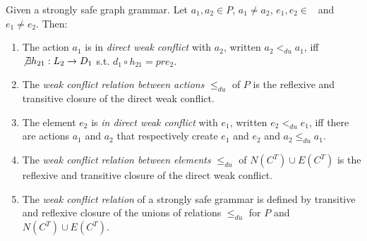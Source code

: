 \begin{definition}\label{def:unconditional-conflict} Given \doublyTypedGraphGrammarCore{} a strongly safe graph grammar. Let $a_1, a_2 \in P$, $a_1 \ne a_2$, \mbox{$e_1, e_2 \in $ \coreGraph{}} and $e_1 \ne e_2$. Then: 

  \begin{enumerate}
    \item The action $a_1$ is in \emph{direct weak conflict} with $a_2$, written $a_2 <_{du} a_1$, iff \mbox{$\not\exists h_{21} : L_2 \rightarrow D_1$} s.t. \mbox{$d_1 \circ h_{21} = pre_2$}.

   \item The \emph{weak conflict relation between actions} $\leq_{du}$ of $P$ is the reflexive and transitive closure of the direct weak conflict.
   \item The element $e_2$ is \emph{in direct weak conflict} with $e_1$, written $e_2 <_{du} e_1$, iff there are actions $a_1$ and $a_2$ that respectively create $e_1$ and $e_2$ and $a_2 \leq_{du} a_1$.
   \item The \emph{weak conflict relation between elements} $\leq_{du}$ of $N(C^T) \cup E(C^T)$ is the reflexive and transitive closure of the direct weak conflict.
   \item The \emph{weak conflict relation} of a strongly safe grammar is defined by transitive and reflexive closure of the unions of relations $\leq_{du}$ for $P$ and $N(C^T) \cup E(C^T)$.

  \end{enumerate}
\end{definition}

